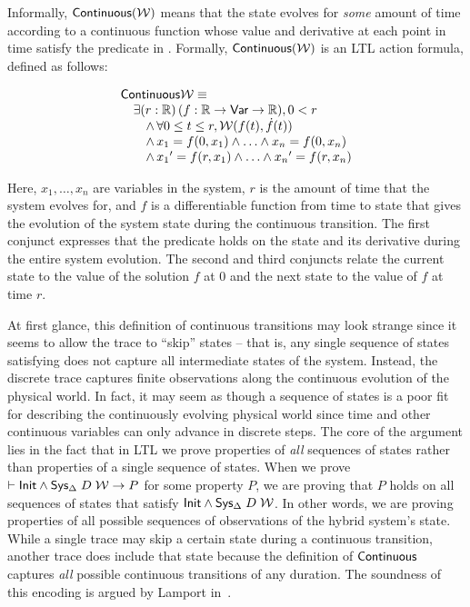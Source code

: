 Informally, $\mathsf{Continuous}{(\mathcal{W})}$ means that the state evolves for
\emph{some} amount of time according to a continuous function whose value
and derivative at each point in time satisfy the predicate in \W.
Formally, $\mathsf{Continuous}{(\mathcal{W})}$ is an LTL action formula, defined as follows:
\begin{definition}
\[\begin{array}{l}
\mathsf{Continuous}{\mathcal{W}} \equiv \\
\quad \exists (r : \mathbb{R})\, (f : \mathbb{R} \rightarrow \textsf{Var} \rightarrow \mathbb{R}), 0 < r \\
\qquad \wedge\, \forall 0 \leq t \leq r, \mathcal{W}(f(t),\dot{f}(t)) \\
\qquad \wedge\, x_1 = f(0,x_1) \wedge \ldots \wedge x_n = f(0,x_n) \\
\qquad \wedge\, x_1{}^\prime = f(r,x_1) \wedge \ldots \wedge x_n{}^\prime = f(r,x_n)
\end{array}
\]
\label{def:continuous}
\end{definition}
Here, $x_1,\ldots,x_n$ are variables in the system, $r$ is the amount of
time that the system evolves for, and $f$ is a differentiable function from
time to state that gives the evolution of the system state during the
continuous transition. The first conjunct expresses that the predicate \W
holds on the state and its derivative during the entire system evolution.
The second and third conjuncts relate the current state to the value of the
solution $f$ at 0 and the next state to the value of $f$ at time $r$.

At first glance, this definition of continuous transitions may look strange
since it seems to allow the trace to ``skip'' states -- that is, any single
sequence of states satisfying \SysA{} does not capture all intermediate
states of the system. Instead, the discrete trace captures finite
observations along the continuous evolution of the physical world.  In
fact, it may seem as though a sequence of states is a poor fit for
describing the continuously evolving physical world since time and other
continuous variables can only advance in discrete steps. The core of the
argument lies in the fact that in LTL we prove properties of \emph{all}
sequences of states rather than properties of a single sequence of
states. When we prove $\vdash \textsf{Init}\wedge{\textsf{Sys}}{}_{\Delta}\;D\;\mathcal{W} \rightarrow
P$ for some property $P$, we are proving that $P$ holds on all sequences of
states that satisfy $\textsf{Init}\wedge{\textsf{Sys}}{}_{\Delta}\;D\;\mathcal{W}$.  In other words, we
are proving properties of all possible sequences of observations of the
hybrid system's state.  While a single trace may skip a certain state
during a continuous transition, another trace does include that state
because the definition of $\mathsf{Continuous}{}$ captures \emph{all} possible
continuous transitions of any duration. The soundness of this encoding is
argued by Lamport in~\cite{lamport2005real}.

